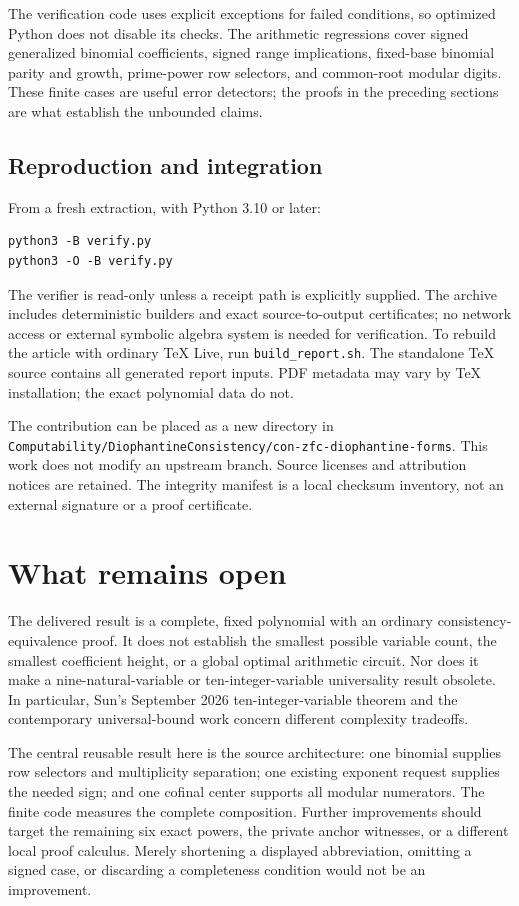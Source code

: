 \documentclass[11pt]{article}
\theoremstyle{remark}\newtheorem{remark}[theorem]{Remark}
\begin{document}
The verification code uses explicit exceptions for failed conditions,
so optimized Python does not disable its checks. The arithmetic
regressions cover signed generalized binomial coefficients, signed
range implications, fixed-base binomial parity and growth, prime-power
row selectors, and common-root modular digits. These finite cases
are useful error detectors; the proofs in the preceding sections are
what establish the unbounded claims.

\subsection{Reproduction and integration}

From a fresh extraction, with Python 3.10 or later:
\begin{verbatim}
python3 -B verify.py
python3 -O -B verify.py
\end{verbatim}
The verifier is read-only unless a receipt path is explicitly supplied.
The archive includes deterministic builders and exact source-to-output
certificates; no network access or external symbolic algebra system is
needed for verification. To rebuild the article with ordinary TeX Live,
run \nolinkurl{build_report.sh}. The standalone TeX source contains
all generated report inputs. PDF metadata may vary by TeX installation;
the exact polynomial data do not.

The contribution can be placed as a new directory in
\nolinkurl{Computability/DiophantineConsistency/con-zfc-diophantine-forms}.
This work does not modify an upstream branch. Source licenses and
attribution notices are retained. The integrity manifest is a local
checksum inventory, not an external signature or a proof certificate.

\section{What remains open}

The delivered result is a complete, fixed polynomial with an ordinary
consistency-equivalence proof. It does not establish the smallest
possible variable count, the smallest coefficient height, or a global
optimal arithmetic circuit. Nor does it make a nine-natural-variable
or ten-integer-variable universality result obsolete. In particular,
Sun's September 2026 ten-integer-variable theorem \cite{sun10}
and the contemporary universal-bound work \cite{bayer} concern
different complexity tradeoffs.

The central reusable result here is the source architecture:
one binomial supplies row selectors and multiplicity separation;
one existing exponent request supplies the needed sign; and one
cofinal center supports all modular numerators. The finite code measures
the complete composition. Further improvements should target the
remaining six exact powers, the private anchor witnesses, or a
different local proof calculus. Merely shortening a displayed
abbreviation, omitting a signed case, or discarding a completeness
condition would not be an improvement.
\end{document}

